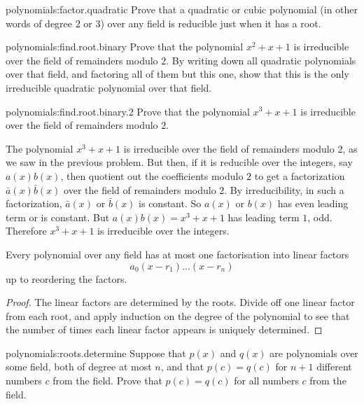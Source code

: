 \begin{problem}{polynomials:factor.quadratic}
Prove that a quadratic or cubic polynomial (in other words of degree \(2\) or \(3\)) over any field is reducible just when it has a root.
\end{problem}
\begin{problem}{polynomials:find.root.binary}
Prove that the polynomial \(x^2+x+1\) is irreducible over the field of remainders modulo \(2\).
By writing down all quadratic polynomials over that field, and factoring all of them but this one, show that this is the only irreducible quadratic polynomial over that field.
\end{problem}
\begin{problem}{polynomials:find.root.binary.2}
Prove that the polynomial \(x^3+x+1\) is irreducible over the field of remainders modulo \(2\).
\end{problem}
\begin{example}
The polynomial \(x^3+x+1\) is irreducible over the field of remainders modulo \(2\), as we saw in the previous problem.
But then, if it is reducible over the integers, say \(a(x)b(x)\), then quotient out the coefficients modulo \(2\) to get a factorization \(\bar{a}(x)\bar{b}(x)\) over the field of remainders modulo \(2\).
By irreducibility, in such a factorization, \(\bar{a}(x)\) or \(\bar{b}(x)\) is constant.
So \(a(x)\) or \(b(x)\) has even leading term or is constant.
But \(a(x)b(x)=x^3+x+1\) has leading term \(1\), odd.
Therefore \(x^3+x+1\) is irreducible over the integers.  
\end{example}
\begin{corollary}
Every polynomial over any field has at most one factorisation into linear factors 
\[
a_0(x-r_1)\dots(x-r_n)
\]
up to reordering the factors.
\end{corollary}
\begin{proof}
The linear factors are determined by the roots.
Divide off one linear factor from each root, and apply induction on the degree of the polynomial to see that the number of times each linear factor appears is uniquely determined.
\end{proof}
\begin{problem}{polynomials:roots.determine}
Suppose that \(p(x)\) and \(q(x)\) are polynomials over some field, both of degree at most \(n\), and that \(p(c)=q(c)\) for \(n+1\) different numbers \(c\) from the field.
Prove that \(p(c)=q(c)\) for all numbers \(c\) from the field.
\end{problem}
